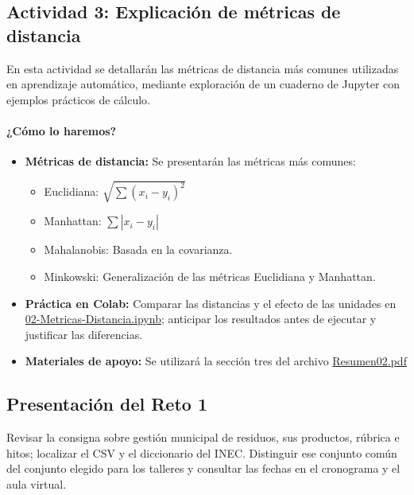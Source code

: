 \documentclass[a4,11pt]{aleph-notas}
\begin{document}
\subsection*{Actividad 3: Explicación de métricas de distancia}

En esta actividad se detallarán las métricas de distancia más comunes utilizadas en aprendizaje automático, mediante exploración de un cuaderno de Jupyter con ejemplos prácticos de cálculo.

\paragraph{¿Cómo lo haremos?}
\begin{itemize}[leftmargin=*]
    \item \textbf{Métricas de distancia:}
    Se presentarán las métricas más comunes:
    \begin{itemize}
        \item Euclidiana: $\sqrt{\sum (x_i - y_i)^2}$
        \item Manhattan: $\sum |x_i - y_i|$
        \item Mahalanobis: Basada en la covarianza.
        \item Minkowski: Generalización de las métricas Euclidiana y Manhattan.
    \end{itemize}
    \item \textbf{Práctica en Colab:} Comparar las distancias y el efecto de las unidades en \href{https://colab.research.google.com/github/andres-merino/AprendizajeAutomaticoInicial-05-N0105/blob/main/2-Notebooks/02-Metricas-Distancia.ipynb}{02-Metricas-Distancia.ipynb}; anticipar los resultados antes de ejecutar y justificar las diferencias.
    \item \textbf{Materiales de apoyo:}
    Se utilizará la sección tres del archivo \href{https://andres-merino.github.io/AprendizajeAutomaticoInicial-05-N0105/2-Resumenes/Resumen02.pdf}{Resumen02.pdf}

\end{itemize}

\subsection*{Presentación del Reto 1}
Revisar la consigna sobre gestión municipal de residuos, sus productos, rúbrica e hitos; localizar el CSV y el diccionario del INEC. Distinguir ese conjunto común del conjunto elegido para los talleres y consultar las fechas en el cronograma y el aula virtual.
\end{document}
